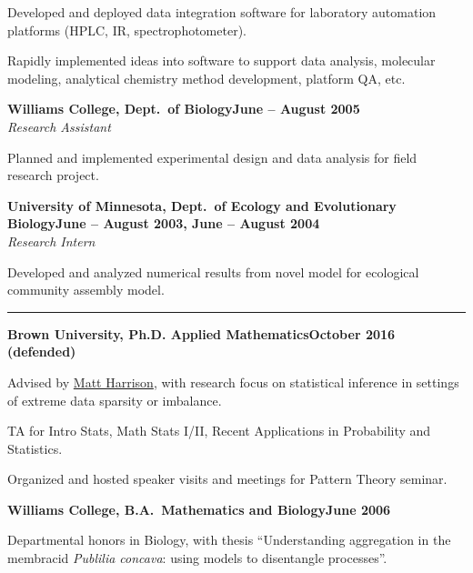 \documentclass{article}
\newcommand{\ressection}[1]{\noindent{\large\textbf{#1}}\vspace{2pt}\hrule\vspace{4pt}}
\newcommand{\leftandright}[2]{\noindent\textbf{#1}\hfill\textbf{#2}}
\begin{document}
\begin{itemize*}
\item Developed and deployed data integration software for laboratory
  automation platforms (HPLC, IR, spectrophotometer).
\item Rapidly implemented ideas into software to support data
  analysis, molecular modeling, analytical chemistry method
  development, platform QA, etc.
\end{itemize*}

\leftandright{Williams College, Dept.\ of Biology}{June -- August 2005} \\
\textit{Research Assistant}

\begin{itemize*}
\item Planned and implemented experimental design and data analysis
  for field research project.
\end{itemize*}

\leftandright{University of Minnesota, Dept.\ of Ecology and
  Evolutionary Biology}{June -- August 2003, June -- August 2004} \\
\textit{Research Intern}

\begin{itemize*}
\item Developed and analyzed numerical results from novel model for ecological
  community assembly model.
\end{itemize*}

\ressection{Education}

\leftandright{Brown University, \textmd{Ph.D. Applied
    Mathematics}}{October 2016 (defended)}
\begin{itemize*}
\item Advised by \href{http://www.dam.brown.edu/people/harrison}{Matt
    Harrison}, with research focus on statistical inference in
  settings of extreme data sparsity or imbalance.
\item TA for Intro Stats, Math Stats I/II, Recent Applications in
  Probability and Statistics.
\item Organized and hosted speaker visits and meetings for Pattern
  Theory seminar.
\end{itemize*}

\leftandright{Williams College, \textmd{B.A.\ Mathematics and
    Biology}}{June 2006}
\begin{itemize*}
\item Departmental honors in Biology, with thesis ``Understanding
  aggregation in the membracid \emph{Publilia concava}: using models
  to disentangle processes''.
\end{itemize*}
\end{document}
